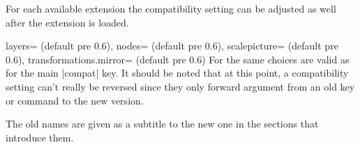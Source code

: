 \begin{multicols}{2}
\newcolumn\noindent
For each available extension the compatibility setting can be adjusted as well
after the extension is loaded.
\begin{keylist}{%
  layers= (default pre 0.6),
  nodes= (default pre 0.6),
  scalepicture= (default pre 0.6),
  transformations.mirror= (default pre 0.6)}
  For  the same choices are valid as for the main |compat| key.
  It should be noted that at this point, a compatibility setting can't really be reversed
  since they only forward argument from an old key or command to the new version.
  
  The old names are given as a subtitle to the new one in the sections that introduce them.
\end{keylist}
\end{multicols}